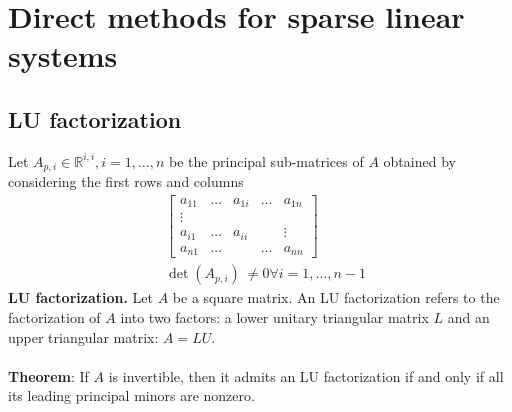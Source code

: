 \documentclass[11pt]{book}
\begin{document}
\chapter{Direct methods for sparse linear
systems}
\section*{LU factorization}
Let $A_{p, i} \in \mathbb{R}^{i, i}, i=1, \ldots, n$ be the principal sub-matrices of $A$ obtained by considering the first rows and columns
$$
\begin{aligned}
& {\left[\begin{array}{ccc|cc}
a_{11} & \ldots & a_{1 i} & \ldots & a_{1 n} \\
\vdots & & & & \\
a_{i 1} & \ldots & a_{i i} & & \vdots \\
a_{n 1} & \ldots & & \ldots & a_{n n}
\end{array}\right]} \\
& \operatorname{det}\left(A_{p, i}\right) \ \neq 0 \forall i=1, \ldots, n-1
\end{aligned}
$$
\textbf{LU factorization.} Let $A$ be a square matrix. An LU factorization refers to the factorization of $A$ into two factors: a lower unitary triangular matrix $L$ and an upper triangular matrix: $A=LU$.\\ \\
\textbf{Theorem}: If $A$ is invertible, then it admits an LU factorization if and only if all its leading principal minors are nonzero.
\end{document}
